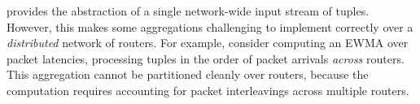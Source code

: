 



 \TheSystem provides the abstraction
of a single network-wide input stream of tuples. However, this makes some
aggregations challenging to implement correctly over a {\em distributed} network
of routers. For example, consider computing an EWMA over packet latencies,
processing tuples in the order of packet arrivals {\em across} routers. This
aggregation cannot be partitioned cleanly over routers, because the
computation requires accounting for packet interleavings across multiple
routers.

